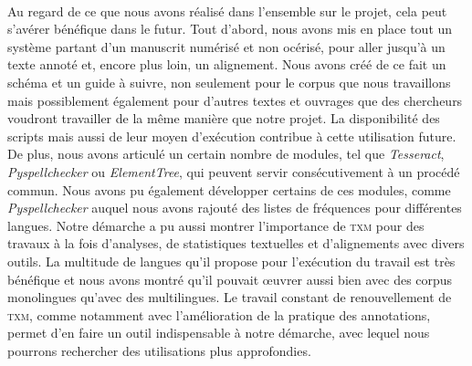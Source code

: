 \paragraph{} Au regard de ce que nous avons réalisé dans l'ensemble sur le projet, cela peut s'avérer bénéfique dans le futur. Tout d'abord, nous avons mis en place tout un système partant d'un manuscrit numérisé et non océrisé, pour aller jusqu'à un texte annoté et, encore plus loin, un alignement. Nous avons créé de ce fait un schéma et un guide à suivre, non seulement pour le corpus que nous travaillons mais possiblement également pour d'autres textes et ouvrages que des chercheurs voudront travailler de la même manière que notre projet. La disponibilité des scripts mais aussi de leur moyen d'exécution contribue à cette utilisation future. De plus, nous avons articulé un certain nombre de modules, tel que \emph{Tesseract}, \emph{Pyspellchecker} ou \emph{ElementTree}, qui peuvent servir consécutivement à un procédé commun. Nous avons pu également développer certains de ces modules, comme \emph{Pyspellchecker} auquel nous avons rajouté des listes de fréquences pour différentes langues. Notre démarche a pu aussi montrer l'importance de \textsc{txm} pour des travaux à la fois d'analyses, de statistiques textuelles et d'alignements avec divers outils. La multitude de langues qu'il propose pour l'exécution du travail est très bénéfique et nous avons montré qu'il pouvait \oe uvrer aussi bien avec des corpus monolingues qu'avec des multilingues. Le travail constant de renouvellement de \textsc{txm}, comme notamment avec l'amélioration de la pratique des annotations, permet d'en faire un outil indispensable à notre démarche, avec lequel nous pourrons rechercher des utilisations plus approfondies.

